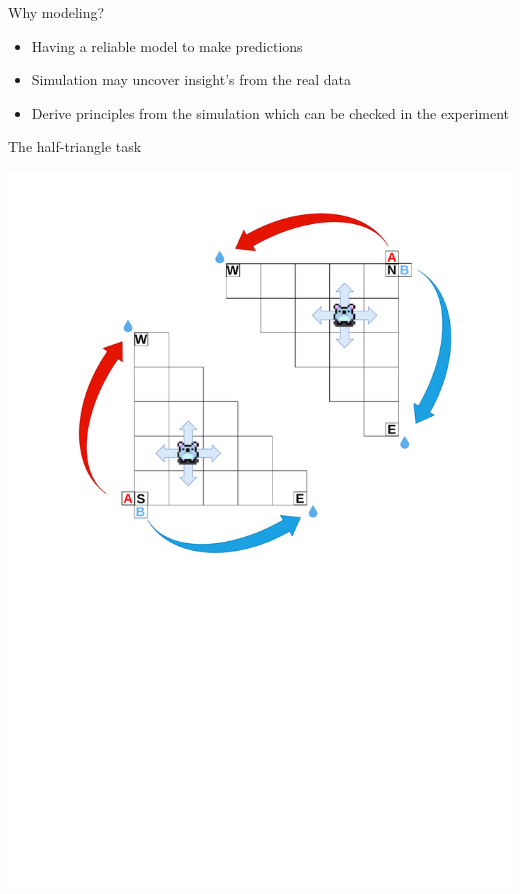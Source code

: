 \documentclass[bigger]{beamer}
\begin{document}
\begin{frame}[<+->][label={sec:org3dea03e}]{Why modeling?}
\begin{itemize}
\item Having a reliable model to make predictions
\item Simulation may uncover insight's from the real data
\item Derive principles from the simulation which can be checked in the experiment
\end{itemize}
\end{frame}
\begin{frame}[label={sec:org784f6d6}]{The half-triangle task}
\begin{center}
\includegraphics[width=.9\linewidth]{img/RL_env-triangle-task.drawio.pdf}
\end{center}
\end{frame}
\end{document}
